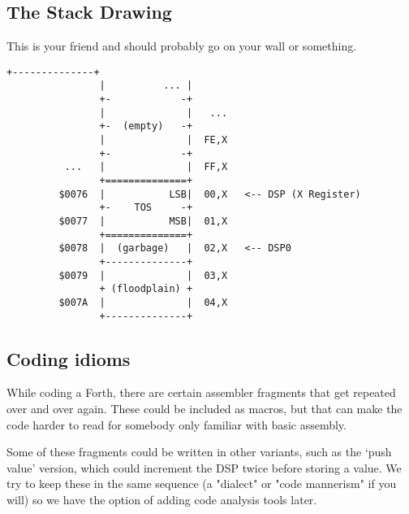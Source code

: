 \subsection{The Stack Drawing}
This is your friend and should probably go on your wall or something.

\begin{lstlisting}[frame=single]
                +--------------+
                |          ... |
                +-            -+
                |              |   ...
                +-  (empty)   -+
                |              |  FE,X
                +-            -+
          ...   |              |  FF,X
                +==============+
         $0076  |           LSB|  00,X   <-- DSP (X Register)
                +-    TOS     -+
         $0077  |           MSB|  01,X
                +==============+
         $0078  |  (garbage)   |  02,X   <-- DSP0
                +--------------+
         $0079  |              |  03,X
                + (floodplain) +
         $007A  |              |  04,X
                +--------------+
\end{lstlisting}

\subsection{Coding idioms}
While coding a Forth, there are certain assembler fragments that get repeated
over and over again. These could be included as macros, but that can make the
code harder to read for somebody only familiar with basic assembly.

Some of these fragments could be written in other variants, such as the `push
value' version, which could increment the DSP twice before storing a value. We
try to keep these in the same sequence (a "dialect" or "code mannerism" if you
will) so we have the option of adding code analysis tools later.

